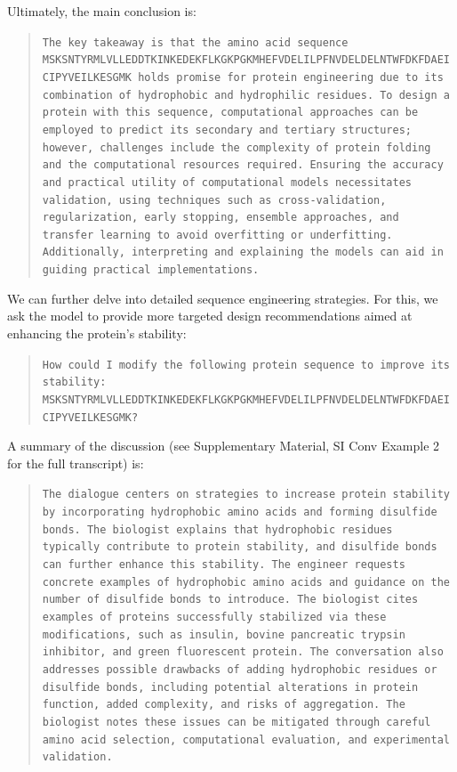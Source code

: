 Ultimately, the main conclusion is:

\begin{quote}
\small\texttt{The key takeaway is that the amino acid sequence MSKSNTYRMLVLLEDDTKINKEDEKFLKGKPGKMHEFVDELILPFNVDELDELNTWFDKFDAEICIPYVEILKESGMK holds promise for protein engineering due to its combination of hydrophobic and hydrophilic residues. To design a protein with this sequence, computational approaches can be employed to predict its secondary and tertiary structures; however, challenges include the complexity of protein folding and the computational resources required. Ensuring the accuracy and practical utility of computational models necessitates validation, using techniques such as cross-validation, regularization, early stopping, ensemble approaches, and transfer learning to avoid overfitting or underfitting. Additionally, interpreting and explaining the models can aid in guiding practical implementations.}
\end{quote}

We can further delve into detailed sequence engineering strategies. For this, we ask the model to provide more targeted design recommendations aimed at enhancing the protein’s stability:

\begin{quote}
\small\texttt{How could I modify the following protein sequence to improve its stability: MSKSNTYRMLVLLEDDTKINKEDEKFLKGKPGKMHEFVDELILPFNVDELDELNTWFDKFDAEICIPYVEILKESGMK? }
\end{quote}

A summary of the discussion (see Supplementary Material, SI Conv Example 2 for the full transcript) is:

\begin{quote}
\small\texttt{The dialogue centers on strategies to increase protein stability by incorporating hydrophobic amino acids and forming disulfide bonds. The biologist explains that hydrophobic residues typically contribute to protein stability, and disulfide bonds can further enhance this stability. The engineer requests concrete examples of hydrophobic amino acids and guidance on the number of disulfide bonds to introduce. The biologist cites examples of proteins successfully stabilized via these modifications, such as insulin, bovine pancreatic trypsin inhibitor, and green fluorescent protein. The conversation also addresses possible drawbacks of adding hydrophobic residues or disulfide bonds, including potential alterations in protein function, added complexity, and risks of aggregation. The biologist notes these issues can be mitigated through careful amino acid selection, computational evaluation, and experimental validation.}
\end{quote}

